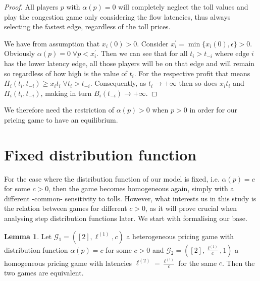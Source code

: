 \documentclass[10pt,a4paper]{book}
\newcommand{\Gm}{\mathcal{G}}
\theoremstyle{definition}
\newtheorem{lemma}[definition]{Lemma}
\theoremstyle{comment}
\begin{document}
\begin{proof}
	All players $p$ with $\alpha(p) = 0$ will completely neglect the toll values and play the congestion game only considering the flow latencies, thus always selecting the fastest edge, regardless of the toll prices.

	We have from assumption that $x_i(0) > 0$.
	Consider $x_i^\prime = \min\{x_i(0), \epsilon\} > 0$.
	Obviously $\alpha(p) = 0 \; \forall p < x_i^\prime$.
	Then we can see that for all $t_i > t_{-i}$ where edge $i$ has the lower latency edge, all those players will be on that edge and will remain so regardless of how high is the value of $t_i$.
	For the respective profit that means $\Pi_i(t_i, t_{-i}) \ge x_i t_i \; \forall t_i > t_{-i}$.
	Consequently, as $t_i \rightarrow +\infty$ then so does $x_i t_i$ and $\Pi_i(t_i, t_{-i})$, making in turn $B_i(t_{-i}) \rightarrow +\infty$.
\end{proof}
We therefore need the restriction of $\alpha(p) > 0$ when $p > 0$ in order for our pricing game to have an equilibrium.

\section{Fixed distribution function}

For the case where the distribution function of our model is fixed, i.e. $\alpha(p) = c$ for some $c > 0$, then the game becomes homogeneous again, simply with a different -common- sensitivity to tolls.
However, what interests us in this study is the relation between games for different $c > 0$, as it will prove crucial when analysing step distribution functions later.
We start with formalising our base.

\begin{lemma}
	\label{lemma:a_fixed_homogeneous}
	Let $\Gm_1 = ([2], \ell^{(1)}, c)$ a heterogeneous pricing game with distribution function $\alpha(p) = c$ for some $c > 0$ and $\Gm_2 = ([2], \frac{\ell^{(1)}}{c}, 1)$ a homogeneous pricing game with latencies $\ell^{(2)} = \frac{\ell^{(1)}}{c}$ for the same $c$.
	Then the two games are equivalent.
\end{lemma}
\end{document}
